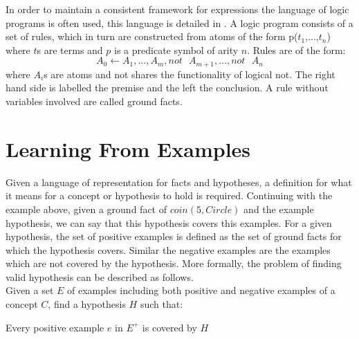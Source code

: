 \documentclass{article}
\begin{document}
In order to maintain a consistent framework for expressions the language of
logic programs is often used, this language is detailed in \cite{lpakr}
\cite{folp}.
A logic program consists of a set of rules, which in turn are constructed from
atoms of the form p($t_1$,...,$t_n$) where $t$s are terms and $p$ is a
predicate symbol of arity $n$. Rules are of the form:
  \begin{equation}
  \displaystyle
  A_0 \leftarrow A_1,...,A_m,not\mbox{ }A_{m+1},...,not\mbox{ }A_n
  \end{equation}
where $A_i$s are atoms and not shares the functionality of logical not. The right
hand side is labelled the premise and the left the conclusion. A rule without
variables involved are called ground facts. 

\section{Learning From Examples}

Given a language of representation for facts and hypotheses, a definition for
what it means for a concept or hypothesis to hold is required. Continuing with
the example above, given a ground fact of $coin(5, Circle)$ and the example
hypothesis, we can say that this hypothesis covers this examples.
For a given hypothesis, the set of positive examples is defined as the set of
ground facts for which the hypothesis covers. Similar the negative examples are
the examples which are not covered by the hypothesis. More formally, the
problem of finding valid hypothesis can be described as follows.\\[5pt]
Given a set $E$ of examples including both positive and negative examples of a
concept $C$, find a hypothesis $H$ such that:

\indent Every positive example $e$ in $E^+$ is covered by $H$
\end{document}
